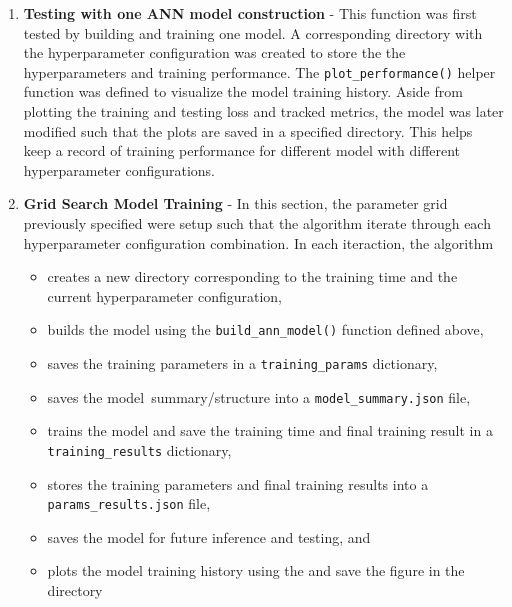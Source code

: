 \documentclass[a4paper]{article}
\begin{document}
\begin{enumerate}
    \item \textbf{Testing with one ANN model construction} - This function was first tested by building and training one model. A corresponding directory with the hyperparameter configuration was created to store the the hyperparameters and training performance. The \lstinline{plot_performance()} helper function was defined to visualize the model training history. Aside from plotting the training and testing loss and tracked metrics, the model was later modified such that the plots are saved in a specified directory. This helps keep a record of training performance for different model with different hyperparameter configurations.

    \item \textbf{Grid Search Model Training} - In this section, the parameter grid previously specified were setup such that the algorithm iterate through each hyperparameter configuration combination. In each iteraction, the algorithm
    \begin{itemize}
        \itemsep=-5pt
        \item creates a new directory corresponding to the training time and the current hyperparameter configuration, 
        \item builds the model using the \lstinline{build_ann_model()} function defined above, 
        \item saves the training parameters in a \lstinline{training_params} dictionary, 
        \item saves the model\ summary/structure into a \lstinline{model_summary.json} file, 
        \item trains the model and save the training time and final training result in a \lstinline{training_results} dictionary, 
        \item stores the training parameters and final training results into a \lstinline{params_results.json} file, 
        \item saves the model for future inference and testing, and 
        \item plots the model training history using the  and save the figure in the directory
    \end{itemize}
    

\end{enumerate}
\end{document}
